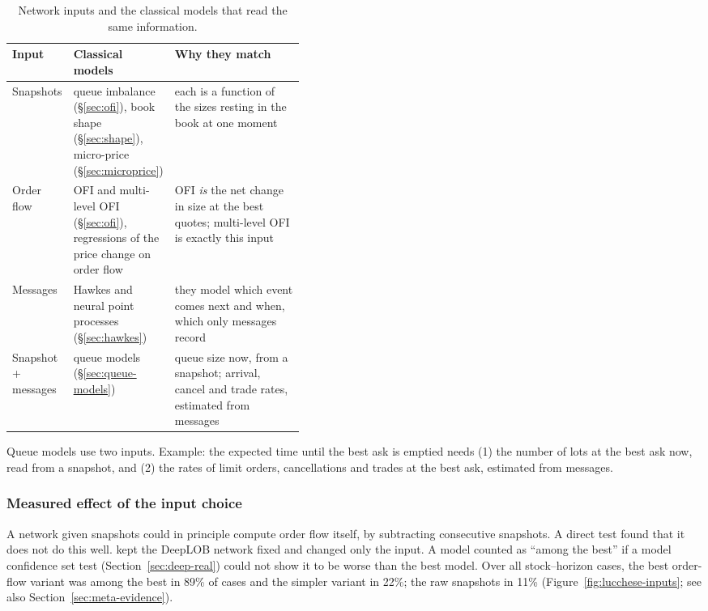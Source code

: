 \begin{table}[!htbp]
\centering\footnotesize
\caption{Network inputs and the classical models that read the same information.}
\label{tab:input-classical}
\begin{tabularx}{\linewidth}{>{\raggedright\arraybackslash}p{0.15\linewidth}>{\raggedright\arraybackslash}p{0.27\linewidth}>{\raggedright\arraybackslash}X}
\toprule
Input & Classical models & Why they match \\
\midrule
Snapshots & queue imbalance (\S\ref{sec:ofi}), book shape (\S\ref{sec:shape}), micro-price (\S\ref{sec:microprice}) & each is a function of the sizes resting in the book at one moment \\
Order flow & OFI and multi-level OFI (\S\ref{sec:ofi}), regressions of the price change on order flow & OFI \emph{is} the net change in size at the best quotes; multi-level OFI is exactly this input \\
Messages & Hawkes and neural point processes (\S\ref{sec:hawkes}) & they model which event comes next and when, which only messages record \\
Snapshot + messages & queue models (\S\ref{sec:queue-models}) & queue size now, from a snapshot; arrival, cancel and trade rates, estimated from messages \\
\bottomrule
\end{tabularx}
\end{table}

Queue models use two inputs. Example: the expected time until the best ask is emptied needs (1) the number of
lots at the best ask now, read from a snapshot, and (2) the rates of limit orders, cancellations and trades at the
best ask, estimated from messages.

\subsubsection{Measured effect of the input choice}
\label{sec:deep-io-effect}

A network given snapshots could in principle compute order flow itself,
by subtracting consecutive snapshots. A direct test found that it does not do this well. \citet{lucchese2024}
kept the DeepLOB network fixed and changed only the input. A model counted as ``among the best'' if a model
confidence set test (Section~\ref{sec:deep-real}) could not show it to be worse than the best model. Over all
stock--horizon cases, the best order-flow variant was among the best in 89\% of cases and the simpler
variant in 22\%; the raw snapshots in 11\% (Figure~\ref{fig:lucchese-inputs}; see also Section~\ref{sec:meta-evidence}).

